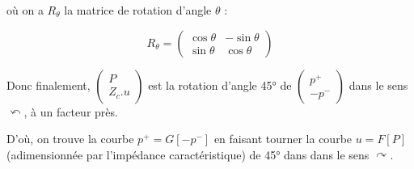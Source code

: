 \documentclass{article}
\newcommand{\pplus}{p^{+}}
\newcommand{\pmoins}{p^{-}}
\begin{document}
où on a $R_\theta$ la matrice de rotation d'angle $\theta$ : 

\begin{equation*}
	R_\theta = \begin{pmatrix}
		\cos \theta & -\sin \theta\\
		\sin \theta & \cos \theta
	\end{pmatrix}
\end{equation*}

Donc finalement, 
$\begin{pmatrix}
	P\\
	Z_{c} .u
\end{pmatrix}$ est la rotation d'angle 45° de $\begin{pmatrix}
\pplus\\
-\pmoins
\end{pmatrix}$ dans le sens $\curvearrowleft$, à un facteur près.

D'où, on trouve la courbe $\pplus = G[-\pmoins]$ en faisant tourner la courbe $u=F[P]$ (adimensionnée par l'impédance caractéristique) de 45° dans dans le sens $\curvearrowright$.
\end{document}
